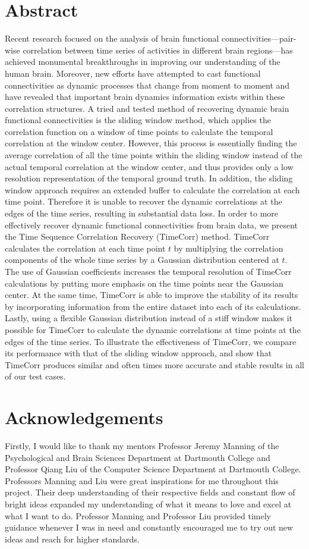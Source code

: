 \documentclass[11pt]{article}
\begin{document}
\section{Abstract}
Recent research focused on the analysis of brain functional connectivities---pair-wise correlation between time series of activities in different brain regions---has achieved monumental breakthroughs in improving our understanding of the human brain. Moreover, new efforts have attempted to cast functional connectivities as dynamic processes that change from moment to moment and have revealed that important brain dynamics information exists within these correlation structures. A tried and tested method of recovering dynamic brain functional connectivities is the sliding window method, which applies the correlation function on a window of time points to calculate the temporal correlation at the window center. However, this process is essentially finding the average correlation of all the time points within the sliding window instead of the actual temporal correlation at the window center, and thus provides only a low resolution representation of the temporal ground truth. In addition, the sliding window approach requires an extended buffer to calculate the correlation at each time point. Therefore it is unable to recover the dynamic correlations at the edges of the time series, resulting in substantial data loss. In order to more effectively recover dynamic functional connectivities from brain data, we present the Time Sequence Correlation Recovery (TimeCorr) method. TimeCorr calculates the correlation at each time point $t$ by multiplying the correlation components of the whole time series by a Gaussian distribution centered at $t$. The use of Gaussian coefficients increases the temporal resolution of TimeCorr calculations by putting more emphasis on the time points near the Gaussian center. At the same time, TimeCorr is able to improve the stability of its results by incorporating information from the entire dataset into each of its calculations. Lastly, using a flexible Gaussian distribution instead of a stiff window makes it possible for TimeCorr to calculate the dynamic correlations at time points at the edges of the time series. To illustrate the effectiveness of TimeCorr, we compare its performance with that of the sliding window approach, and show that TimeCorr produces similar and often times more accurate and stable results in all of our test cases.

\newpage
\section{Acknowledgements}
Firstly, I would like to thank my mentors Professor Jeremy Manning of the Psychological and Brain Sciences Department at Dartmouth College and Professor Qiang Liu of the Computer Science Department at Dartmouth College. Professors Manning and Liu were great inspirations for me throughout this project. Their deep understanding of their respective fields and constant flow of bright ideas expanded my understanding of what it means to love and excel at what I want to do. Professor Manning and Professor Liu provided timely guidance whenever I was in need and constantly encouraged me to try out new ideas and reach for higher standards.
\end{document}
